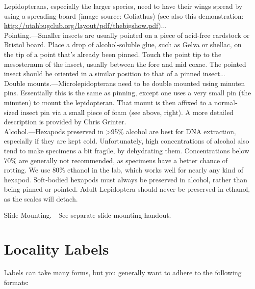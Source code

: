 \documentclass[letterpaper, 11pt]{article}
\begin{document}
Lepidopterans, especially the larger species, need to have their wings spread by using a spreading board (image source: Goliathus) (see also this demonstration: \url{http://utahbugclub.org/layout/pdf/thebigshow.pdf})...\\

Pointing.---Smaller insects are usually pointed on a piece of acid-free cardstock or Bristol board. Place a drop of alcohol-soluble glue, such as Gelva or shellac, on the tip of a point that’s already been pinned. Touch the point tip to the mesosternum of the insect, usually between the fore and mid coxae. The pointed insect should be oriented in a similar position to that of a pinned insect...\\

Double mounts.---Microlepidopterans need to be double mounted using minuten pins. Essentially this is the same as pinning, except one uses a very small pin (the minuten) to mount the lepidopteran. That mount is then affixed to a normal-sized insect pin via a small piece of foam (see above, right). A more detailed description is provided by Chris Grinter.\\

Alcohol.---Hexapods preserved in \textgreater95\% alcohol are best for DNA extraction, especially if they are kept cold. Unfortunately, high concentrations of alcohol also tend to make specimens a bit fragile, by dehydrating them. Concentrations below 70\% are generally not recommended, as specimens have a better chance of rotting. We use 80\% ethanol in the lab, which works well for nearly any kind of hexapod. Soft-bodied hexapods must always be preserved in alcohol, rather than being pinned or pointed. Adult Lepidoptera should never be preserved in ethanol, as the scales will detach.

Slide Mounting.---See separate slide mounting handout.

\section*{Locality Labels}

Labels can take many forms, but you generally want to adhere to the following formats:
\end{document}

